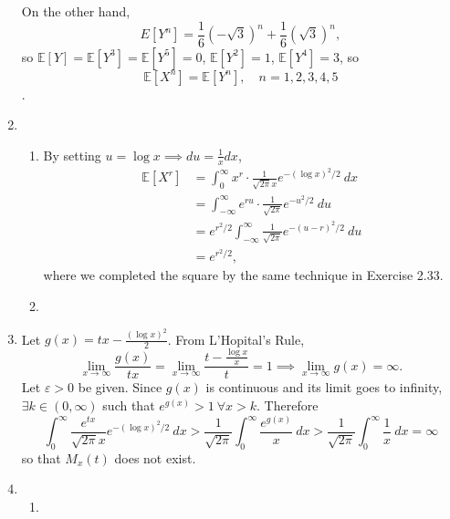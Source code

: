 \documentclass{article}
\begin{document}
\begin{enumerate}
    On the other hand, 
    \[ E[Y^n] = \frac{1}{6}(-\sqrt{3})^n + \frac{1}{6}(\sqrt{3})^n, \]
    so $\mathbb{E}[Y] = \mathbb{E}[Y^3] = \mathbb{E}[Y^5] = 0$, $\mathbb{E}[Y^2] = 1$, 
    $\mathbb{E}[Y^4] = 3$, so 
    \[ \mathbb{E}[X^n] = \mathbb{E}[Y^n], \quad n = 1, 2, 3, 4, 5 \].

    \item \begin{enumerate}
        \item By setting $u = \log{x} \implies du = \frac{1}{x} dx$, 
        \begin{align*}
            \mathbb{E}[X^r] 
            &= \int_{0}^{\infty} x^r \cdot \frac{1}{\sqrt{2\pi}x} e^{-(\log{x})^2 / 2} \ dx \\
            &= \int_{-\infty}^{\infty} e^{ru} \cdot \frac{1}{\sqrt{2\pi}} e^{-u^2 / 2} \ du \\
            &= e^{r^2 / 2} \int_{-\infty}^{\infty} \frac{1}{\sqrt{2\pi}} e^{-(u - r)^2 / 2} \ du \\
            &= e^{r^2 / 2},
        \end{align*}
        where we completed the square by the same technique in Exercise 2.33.

        \item 
    \end{enumerate}

    \item Let $g(x) = tx - \frac{(\log{x})^2}{2}$. From L'Hopital's Rule, 
    \[ \lim_{x \to \infty} \frac{g(x)}{tx} = \lim_{x \to \infty} \frac{t - \frac{\log{x}}{x}}{t} = 1 
    \implies \lim_{x \to \infty} g(x) = \infty. \]
    Let $\varepsilon > 0$ be given. Since $g(x)$ is continuous and its limit goes to infinity, $\exists 
    k \in (0, \infty)$ such that $e^{g(x)} > 1 \ \forall x > k$. Therefore 
    \[ \int_{0}^{\infty} \frac{e^{tx}}{\sqrt{2\pi}x}e^{-(\log{x})^2 / 2} \ dx 
    > \frac{1}{\sqrt{2\pi}} \int_{0}^{\infty} \frac{e^{g(x)}}{x} \ dx 
    > \frac{1}{\sqrt{2\pi}} \int_{0}^{\infty} \frac{1}{x} \ dx = \infty \]
    so that $M_x(t)$ does not exist.

    \item \begin{enumerate}
        \item 
    \end{enumerate}


\end{enumerate}
\end{document}
